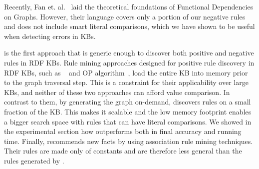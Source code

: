 %
Recently, Fan et. al.~\cite{FanFDGraphs} laid the theoretical foundations of Functional Dependencies on Graphs. %
However, their language covers only a portion of our negative rules %
and does not include smart literal comparisons, which we have shown to be useful when detecting errors in KBs.

\krd is the first approach that is generic enough %
to discover both positive and negative rules in RDF KBs.
Rule mining approaches designed for positive rule discovery in RDF KBs, such as \amie~\cite{galarraga2015fast} and OP algorithm~\cite{Chen:2016}, load the entire KB into memory prior to 
the graph traversal step. %
This is a constraint for their applicability over large KBs, and neither of these two approaches can afford value comparison. 
In contrast to them, by generating the graph on-demand, \krd discovers rules on a small fraction of the KB. This makes it scalable and the low memory footprint enables a bigger search space with rules that can have literal comparisons. %
We showed in the experimental section how \krd outperforms \amie both in final accuracy and running time.
Finally, \cite{abedjan2014amending} recommends new facts by using association rule mining techniques. Their rules are made only of constants and are therefore less general than the rules generated by \krd.

